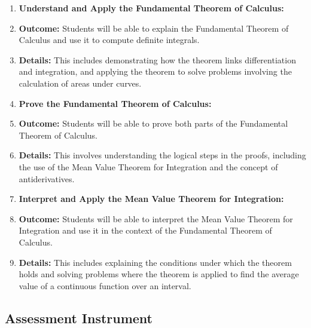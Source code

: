 \begin{enumerate}
    \item \textbf{Understand and Apply the Fundamental Theorem of Calculus:}
    \item \textbf{Outcome:} Students will be able to explain the Fundamental Theorem of Calculus and use it to compute definite integrals.
    \item \textbf{Details:} This includes demonstrating how the theorem links differentiation and integration, and applying the theorem to solve problems involving the calculation of areas under curves.
    \item \textbf{Prove the Fundamental Theorem of Calculus:}
    \item \textbf{Outcome:} Students will be able to prove both parts of the Fundamental Theorem of Calculus.
    \item \textbf{Details:} This involves understanding the logical steps in the proofs, including the use of the Mean Value Theorem for Integration and the concept of antiderivatives.
    \item \textbf{Interpret and Apply the Mean Value Theorem for Integration:}
    \item \textbf{Outcome:} Students will be able to interpret the Mean Value Theorem for Integration and use it in the context of the Fundamental Theorem of Calculus.
    \item \textbf{Details:} This includes explaining the conditions under which the theorem holds and solving problems where the theorem is applied to find the average value of a continuous function over an interval.
\end{enumerate}

\subsection{Assessment Instrument}

